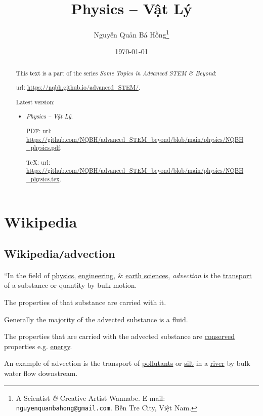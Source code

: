 \documentclass{article}
\title{Physics -- Vật Lý}
\author{Nguyễn Quản Bá Hồng\footnote{A Scientist {\it\&} Creative Artist Wannabe. E-mail: {\tt nguyenquanbahong@gmail.com}. Bến Tre City, Việt Nam.}}
\date{\today}
\begin{document}
\maketitle
\begin{abstract}
	This text is a part of the series {\it Some Topics in Advanced STEM \& Beyond}:
	
	{\sc url}: \url{https://nqbh.github.io/advanced_STEM/}.
	
	Latest version:
	\begin{itemize}
		\item {\it Physics -- Vật Lý}.
		
		PDF: {\sc url}: \url{https://github.com/NQBH/advanced_STEM_beyond/blob/main/physics/NQBH_physics.pdf}.
		
		\TeX: {\sc url}: \url{https://github.com/NQBH/advanced_STEM_beyond/blob/main/physics/NQBH_physics.tex}.
	\end{itemize}
\end{abstract}
\tableofcontents


\section{Wikipedia}

\subsection{Wikipedia{\tt/}advection}
``In the field of \href{https://en.wikipedia.org/wiki/Physics}{physics}, \href{https://en.wikipedia.org/wiki/Engineering}{engineering}, \& \href{https://en.wikipedia.org/wiki/Earth_science}{earth sciences}, {\it advection} is the \href{https://en.wikipedia.org/wiki/Transport}{transport} of a substance or quantity by bulk motion.

The properties of that substance are carried with it.

Generally the majority of the advected substance is a fluid.

The properties that are carried with the advected substance are \href{https://en.wikipedia.org/wiki/Conservation_of_energy}{conserved} properties e.g. \href{https://en.wikipedia.org/wiki/Energy}{energy}.

An example of advection is the transport of \href{https://en.wikipedia.org/wiki/Pollutant}{pollutants} or \href{https://en.wikipedia.org/wiki/Silt}{silt} in a \href{https://en.wikipedia.org/wiki/River}{river} by bulk water flow downstream.
\end{document}
